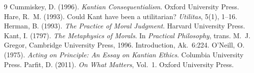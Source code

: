 \documentclass{situationist-preprint}
\begin{document}
\begin{thebibliography}{9}\small
{} Cummiskey, D. (1996). \emph{Kantian Consequentialism}. Oxford University Press.
 Hare, R.~M. (1993). Could Kant have been a utilitarian? \emph{Utilitas}, 5(1), 1--16.
 Herman, B. (1993). \emph{The Practice of Moral Judgment}. Harvard University Press.
 Kant, I. (1797). \emph{The Metaphysics of Morals}. In \emph{Practical Philosophy}, trans. M.~J. Gregor, Cambridge University Press, 1996. Introduction, Ak.~6:224.
 O'Neill, O. (1975). \emph{Acting on Principle: An Essay on Kantian Ethics}. Columbia University Press.
 Parfit, D. (2011). \emph{On What Matters}, Vol.~1. Oxford University Press.
\end{thebibliography}
\end{document}
